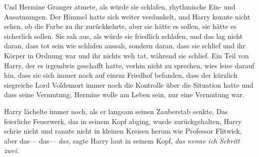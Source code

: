 Und Hermine Granger atmete, als würde sie schlafen, rhythmische Ein- und Ausatmungen. Der Himmel hatte sich weiter verdunkelt, und Harry konnte nicht sehen, ob die Farbe zu ihr zurückkehrte, aber sie hätte es sollen, sie hätte es sicherlich sollen. Sie sah aus, als würde sie friedlich schlafen, und das lag nicht daran, dass tot sein wie schlafen aussah, sondern daran, dass sie schlief und ihr Körper in Ordnung war und ihr nichts weh tat, während sie schlief.
Ein Teil von Harry, der es irgendwie geschafft hatte, vorhin nicht zu sprechen, wies leise darauf hin, dass sie sich immer noch auf einem Friedhof befanden, dass der kürzlich siegreiche Lord Voldemort immer noch die Kontrolle über die Situation hatte und dass seine Vermutung, Hermine wolle am Leben sein, nur eine Vermutung war.

Harry lächelte immer noch, als er langsam seinen Zauberstab senkte. Das feierliche Feuerwerk, das in seinem Kopf abging, wurde zurückgehalten, Harry schrie nicht und rannte nicht in kleinen Kreisen herum wie Professor Flitwick, aber das—
das—
\emph{\emph{das,}} sagte Harry laut in seinem Kopf, \emph{\emph{das} nenne ich Schritt zwei.}

